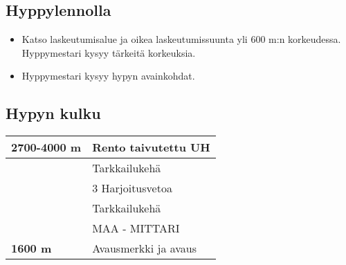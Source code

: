 \subsection{ Hyppylennolla }
\label{nova-alkeiskoulutuksen-suoritukset-hyppylennolla}

\begin{itemize}
\item  Katso laskeutumisalue ja oikea laskeutumissuunta yli 600 m:n korkeudessa. Hyppymestari kysyy tärkeitä korkeuksia. 
\item  Hyppymestari kysyy hypyn avainkohdat. 
\end{itemize}
\subsection{ Hypyn kulku }
\label{nova-alkeiskoulutuksen-suoritukset-hypyn-kulku}

\begin{tabular}[]{|l|p{4.7cm}|}
\hline
 \textbf{2700-4000 m} &  Rento taivutettu UH
\\ \hline
  &  Tarkkailukehä
\\ \hline
  &  3 Harjoitusvetoa
\\ \hline
  &  Tarkkailukehä
\\ \hline
  &  MAA - MITTARI
\\ \hline
 \textbf{1600 m} &  Avausmerkki ja avaus
\\ \hline
\end{tabular}

